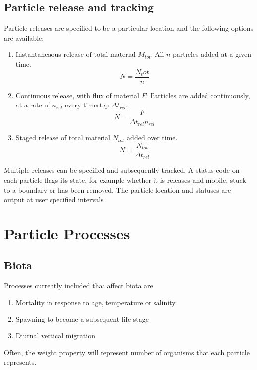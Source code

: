 \documentclass[a4paper]{article}
\begin{document}
\subsection{Particle release and tracking}
Particle releases are specified to be a particular location and the following options are available:
\begin{enumerate}
\item Instantaneaous release of total material $M_{tot}$: All $n$ particles added at a given time.
\begin{equation} N=\frac{N_tot}{n} \end{equation}
\item Continuous release, with flux of material $F$: Particles are added continuously, at a rate of $n_{rel}$ every timestep $\Delta t_{rel}$.
\begin{equation} N=\frac{F}{\Delta t_{rel} n_{rel}}\end{equation} 
\item Staged release of total material $N_{tot}$ added over time.
\begin{equation} N=\frac{N_{tot}}{\Delta t_{rel}}\end{equation}
\end{enumerate}

Multiple releases can be specified and subsequently tracked.
A status code on each particle flags its state, for example whether it is releases and mobile, stuck to a boundary or has been removed.
The particle location and statuses are output at user specified intervals.

\section{Particle Processes}
\subsection{Biota}
Processes currently included that affect biota are:
\begin{enumerate}
\item Mortality in response to age, temperature or salinity
\item Spawning to become a subsequent life stage
\item Diurnal vertical migration
\end{enumerate}
Often, the weight property will represent number of organisms that each particle represents.
\end{document}
